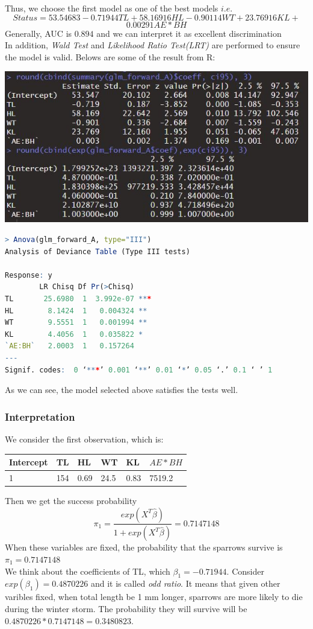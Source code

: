 \documentclass[12pt,a4paper]{article}
\begin{document}
Thus, we choose the first model as one of the best models $i.e.$
\[Status = 53.54683 - 0.71944TL + 58.16916HL - 0.90114WT + 23.76916KL +\]\[ 0.00291AE*BH\]
Generally, AUC is $0.894$ and we can interpret it as excellent discrimination\\
\newline
In addition, \emph{Wald Test} and \emph{Likelihood Ratio Test(LRT)} are performed to ensure the model is valid. Belows are some of the result from R:
\begin{center}
\includegraphics[scale = 0.6]{wald.jpg}
\end{center}
\begin{lstlisting}[language = R]
> Anova(glm_forward_A, type="III")
Analysis of Deviance Table (Type III tests)

Response: y
        LR Chisq Df Pr(>Chisq)    
TL       25.6980  1  3.992e-07 ***
HL        8.1424  1   0.004324 ** 
WT        9.5551  1   0.001994 ** 
KL        4.4056  1   0.035822 *  
`AE:BH`   2.0003  1   0.157264    
---
Signif. codes:  0 ‘***’ 0.001 ‘**’ 0.01 ‘*’ 0.05 ‘.’ 0.1 ‘ ’ 1
\end{lstlisting}
As we can see, the model selected above satisfies the tests well. 
\subsubsection{Interpretation}
We consider the first observation, which is:	
\begin{center}
\begin{tabular}{|l|l|l|l|l|l|}
\hline
Intercept & TL  & HL   & WT   & KL   & $AE*BH$ \\ \hline
1         & 154 & 0.69 & 24.5 & 0.83 & 7519.2  \\ \hline
\end{tabular}
\end{center}
Then we get the success probability \[\pi_1 = \frac{exp(X^T\hat{\beta})}{1+exp(X^T\hat{\beta})} = 0.7147148\]
When these variables are fixed, the probability that the sparrows survive is $\pi_1 = 0.7147148$\\
\newline
We think about the coefficients of TL, which $\beta_1 = -0.71944$. Consider $exp(\beta_1) = 0.4870226$ and it is called \emph{odd ratio}. It means that given other varibles fixed, when total length be 1 mm longer, sparrows are more likely to die during the winter storm. The probability they will survive will be $0.4870226 * 0.7147148 = 0.3480823$.
\end{document}
